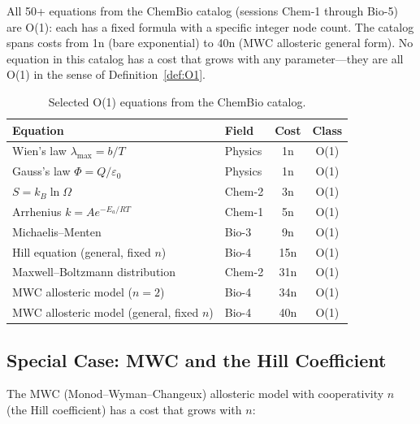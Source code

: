 \documentclass[12pt,a4paper]{article}
\theoremstyle{definition}
\begin{document}
All 50+ equations from the ChemBio catalog (sessions Chem-1 through
Bio-5) are O(1): each has a fixed formula with a specific integer
node count.  The catalog spans costs from 1n (bare exponential) to
40n (MWC allosteric general form).  No equation in this catalog has a
cost that grows with any parameter---they are all O(1) in the sense
of Definition~\ref{def:O1}.

\begin{table}[h]
\centering
\caption{Selected O(1) equations from the ChemBio catalog.}
\label{tab:O1_catalog}
\smallskip
\begin{tabular}{@{}llcc@{}}
\toprule
\textbf{Equation} & \textbf{Field} & \textbf{Cost} & \textbf{Class} \\
\midrule
Wien's law $\lambda_{\max}=b/T$             & Physics      & 1n  & O(1) \\
Gauss's law $\Phi = Q/\varepsilon_0$        & Physics      & 1n  & O(1) \\
$S = k_B \ln\Omega$                         & Chem-2       & 3n  & O(1) \\
Arrhenius $k = Ae^{-E_a/RT}$               & Chem-1       & 5n  & O(1) \\
Michaelis--Menten                           & Bio-3        & 9n  & O(1) \\
Hill equation (general, fixed $n$)          & Bio-4        & 15n & O(1) \\
Maxwell--Boltzmann distribution             & Chem-2       & 31n & O(1) \\
MWC allosteric model ($n=2$)               & Bio-4        & 34n & O(1) \\
MWC allosteric model (general, fixed $n$)   & Bio-4        & 40n & O(1) \\
\bottomrule
\end{tabular}
\end{table}

\subsection{Special Case: MWC and the Hill Coefficient}

The MWC (Monod--Wyman--Changeux) allosteric model with cooperativity
$n$ (the Hill coefficient) has a cost that grows with $n$:
\end{document}
